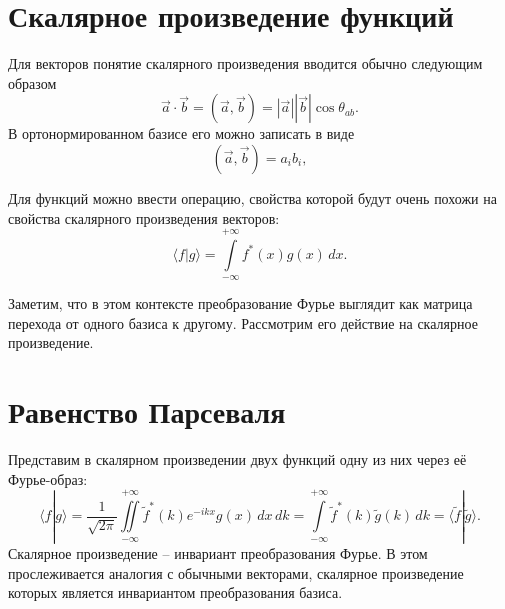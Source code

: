 \documentclass{ncc}
\begin{document}
\section{Скалярное произведение функций}

Для векторов понятие скалярного произведения вводится обычно следующим
образом
\[
    \vec{a} \cdot \vec{b} = (\vec{a}, \vec{b}) = |\vec{a}| |\vec{b}| \cos\theta_{ab}.
\]
В ортонормированном базисе его можно записать в виде
\[
    (\vec{a}, \vec{b}) = a_ib_i,
\]

Для функций можно ввести операцию, свойства которой будут очень похожи на
свойства скалярного произведения векторов:
\[
    \langle f | g \rangle = \int\limits_{-\infty}^{+\infty} f^\ast(x) g(x)\,
    dx.
\]

Заметим, что в этом контексте преобразование Фурье выглядит как матрица
перехода от одного базиса к другому. Рассмотрим его действие на
скалярное произведение.

\section{Равенство Парсеваля}

Представим в скалярном произведении двух функций одну из них через её
Фурье-образ:
\[
    \langle f | g \rangle =
    \frac{1}{\sqrt{2\pi}}\iint\limits_{-\infty}^{+\infty}
    \tilde{f}^\ast(k) e^{-ikx} g(x) \,dx\,dk=
    \int\limits_{-\infty}^{+\infty} \tilde{f}^\ast(k) \tilde{g}(k)\,dk =
    \langle \tilde{f} | \tilde{g} \rangle.
\]
Скалярное произведение -- инвариант преобразования Фурье. В этом
прослеживается аналогия с обычными векторами, скалярное произведение которых
является инвариантом преобразования базиса.
\end{document}
